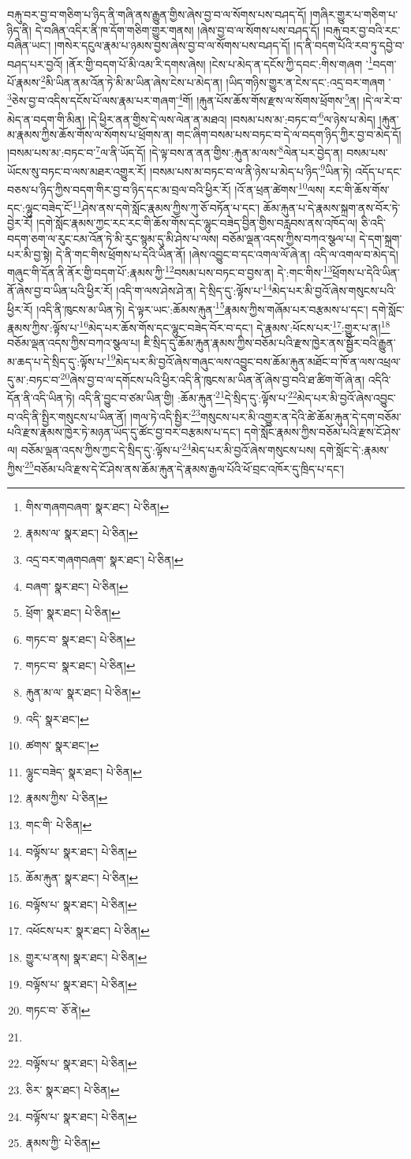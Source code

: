 བརྐུ་བར་བྱ་བ་གཅིག་པ་ཉིད་ནི་གཞི་ནས་རྒྱུན་གྱིས་ཞེས་བྱ་བ་ལ་སོགས་པས་བཤད་དོ། །གཞིར་གྱུར་པ་གཅིག་པ་ཉིད་ནི། དེ་བཞིན་འདིར་ནི་ཁ་དོག་གཅིག་གྱུར་གནས། །ཞེས་བྱ་བ་ལ་སོགས་པས་བཤད་དོ། །བརྐུ་བར་བྱ་བའི་རང་བཞིན་ཡང་། །གསེར་དངུལ་རྣམ་པ་ཉམས་བྱས་ཞེས་བྱ་བ་ལ་སོགས་པས་བཤད་དོ། །ད་ནི་བདག་པོའི་རབ་ཏུ་དབྱེ་བ་བཤད་པར་བྱའོ། །ནོར་གྱི་བདག་པོ་མི་འམ་རི་དགས་ཞེས། །ངེས་པ་མེད་ན་དངོས་ཀྱི་དབང་:གིས་གཞག ་\footnote{གིས་གཞགབཞག་  སྣར་ཐང་།  པེ་ཅིན། }བདག་པོ་རྣམས་\footnote{རྣམས་ལ་  སྣར་ཐང་།  པེ་ཅིན། }མི་ཡིན་ནམ་འོན་ཏེ་མི་མ་ཡིན་ཞེས་ངེས་པ་མེད་ན། །ཡིད་གཉིས་གྱུར་ན་ངེས་དང་:འདྲ་བར་གཞག ་\footnote{འདྲ་བར་གཞགབཞག་  སྣར་ཐང་།  པེ་ཅིན། }ཅེས་བྱ་བ་འདིས་དངོས་པོ་ལས་རྣམ་པར་གཞག་\footnote{བཞག་  སྣར་ཐང་།  པེ་ཅིན། }གོ། །རྐུན་པོས་ཆོས་གོས་རྫས་ལ་སོགས་ཕྲོགས་\footnote{ཕྲོག་  སྣར་ཐང་།  པེ་ཅིན། }ན། །དེ་ལ་རེ་བ་མེད་ན་བདག་གི་མིན། །དེ་ཕྱིར་ནན་གྱིས་དེ་ལས་ལེན་ན་མཐའ། །བསམ་པས་མ་:བཏང་བ་\footnote{གཏང་བ་  སྣར་ཐང་།  པེ་ཅིན། }ལ་ཉེས་པ་མེད། །རྐུན་མ་རྣམས་ཀྱིས་ཆོས་གོས་ལ་སོགས་པ་ཕྲོགས་ན། གང་ཞིག་བསམ་པས་བཏང་བ་དེ་ལ་བདག་ཉིད་ཀྱིར་བྱ་བ་མེད་དོ། །བསམ་པས་མ་:བཏང་བ་\footnote{གཏང་བ་  སྣར་ཐང་།  པེ་ཅིན། }ལ་ནི་ཡོད་དོ། །དེ་ལྟ་བས་ན་ནན་གྱིས་:རྐུན་མ་ལས་\footnote{རྐུན་མ་ལ་  སྣར་ཐང་།  པེ་ཅིན། }ལེན་པར་བྱེད་ན། བསམ་པས་ཡོངས་སུ་བཏང་བ་ལས་མཐར་འགྱུར་རོ། །བསམ་པས་མ་བཏང་བ་ལ་ནི་ཉེས་པ་མེད་པ་ཉིད་\footnote{འདི་  སྣར་ཐང་། }ཡིན་ཏེ། འདོད་པ་དང་བཅས་པ་ཉིད་ཀྱིས་བདག་གིར་བྱ་བ་ཉིད་དང་མ་བྲལ་བའི་ཕྱིར་རོ། །འོ་ན་ཕྲན་ཚེགས་\footnote{ཚགས་  སྣར་ཐང་། }ལས། རང་གི་ཆོས་གོས་དང་:ལྷུང་བཟེད་ངོ་\footnote{ལྷུང་བཟེད་  སྣར་ཐང་།  པེ་ཅིན། }ཤེས་ནས་དགེ་སློང་རྣམས་ཀྱིས་ཀུ་ཅོ་བཏོན་པ་དང་། ཆོམ་རྐུན་པ་དེ་རྣམས་སྐྲག་ནས་བོར་ཏེ་བྱེར་རོ། །དགེ་སློང་རྣམས་ཀྱང་རང་རང་གི་ཆོས་གོས་དང་ལྷུང་བཟེད་བྱིན་གྱིས་བརླབས་ནས་འཁོད་ལ། ཅི་འདི་བདག་ཅག་ལ་རུང་ངམ་འོན་ཏེ་མི་རུང་སྙམ་དུ་མི་ཤེས་པ་ལས། བཅོམ་ལྡན་འདས་ཀྱིས་བཀའ་སྩལ་པ། དེ་དག་སྐྲག་པར་མི་བྱ་སྟེ། དེ་ནི་གང་གིས་ཕྲོགས་པ་དེའི་ཡིན་ནོ། །ཞེས་འབྱུང་བ་དང་འགལ་ལོ་ཞེ་ན། འདི་ལ་འགལ་བ་མེད་དེ། གཞུང་གི་དོན་ནི་ནོར་གྱི་བདག་པོ་:རྣམས་ཀྱི་\footnote{རྣམས་ཀྱིས་  པེ་ཅིན། }བསམ་པས་བཏང་བ་བྱས་ན། དེ་:གང་གིས་\footnote{གང་གི་  པེ་ཅིན། }ཕྲོགས་པ་དེའི་ཡིན་ནོ་ཞེས་བྱ་བ་ཡིན་པའི་ཕྱིར་རོ། །འདི་ག་ལས་ཤེས་ཤེ་ན། དེ་སྲིད་དུ་:ལྟོས་པ་\footnote{བལྟོས་པ་  སྣར་ཐང་།  པེ་ཅིན། }མེད་པར་མི་བྱའོ་ཞེས་གསུངས་པའི་ཕྱིར་རོ། །འདི་ནི་ཁུངས་མ་ཡིན་ཏེ། དེ་ལྟར་ཡང་:ཆོམས་རྐུན་\footnote{ཆོམ་རྐུན་  སྣར་ཐང་།  པེ་ཅིན། }རྣམས་ཀྱིས་གཞོམ་པར་བརྩམས་པ་དང་། དགེ་སློང་རྣམས་ཀྱིས་:ལྟོས་པ་\footnote{བལྟོས་པ་  སྣར་ཐང་།  པེ་ཅིན། }མེད་པར་ཆོས་གོས་དང་ལྷུང་བཟེད་བོར་བ་དང་། དེ་རྣམས་:ཕོངས་པར་\footnote{འཕོངས་པར་  སྣར་ཐང་།  པེ་ཅིན། }:གྱུར་པ་ན།\footnote{གྱུར་པ་ནས།  སྣར་ཐང་།  པེ་ཅིན། } བཅོམ་ལྡན་འདས་ཀྱིས་བཀའ་སྩལ་པ། ཇི་སྲིད་དུ་ཆོམ་རྐུན་རྣམས་ཀྱིས་བཅོམ་པའི་རྫས་ཁྱེར་ནས་སྦྱོར་བའི་རྒྱུན་མ་ཆད་པ་དེ་སྲིད་དུ་:ལྟོས་པ་\footnote{བལྟོས་པ་  སྣར་ཐང་།  པེ་ཅིན། }མེད་པར་མི་བྱའོ་ཞེས་གཞུང་ལས་འབྱུང་བས་ཆོམ་རྐུན་མཐོང་བ་ཁོ་ན་ལས་འཕྲལ་དུ་མ་:བཏང་བ་\footnote{གཏང་བ་  ཅོ་ནེ། }ཞེས་བྱ་བ་ལ་དགོངས་པའི་ཕྱིར་འདི་ནི་ཁུངས་མ་ཡིན་ནོ་ཞེས་བྱ་བའི་ཐ་ཚིག་གོ་ཞེ་ན། འདིའི་དོན་ནི་འདི་ཡིན་ཏེ། འདི་ནི་བྱུང་བ་ཙམ་ཡིན་གྱི། :ཆོམ་རྐུན་\footnote{}དེ་སྲིད་དུ་:ལྟོས་པ་\footnote{བལྟོས་པ་  སྣར་ཐང་།  པེ་ཅིན། }མེད་པར་མི་བྱའོ་ཞེས་འབྱུང་བ་འདི་ནི་སྤྱིར་གསུངས་པ་ཡིན་ནོ། །གལ་ཏེ་འདི་སྤྱིར་\footnote{ཅིར་  སྣར་ཐང་།  པེ་ཅིན། }གསུངས་པར་མི་འགྱུར་ན་དེའི་ཚེ་ཆོམ་རྐུན་དེ་དག་བཅོམ་པའི་རྫས་རྣམས་ཁྱེར་ཏེ་མཉན་ཡོད་དུ་ཚོང་བྱ་བར་བརྩམས་པ་དང་། དགེ་སློང་རྣམས་ཀྱིས་བཅོམ་པའི་རྫས་ངོ་ཤེས་ལ། བཅོམ་ལྡན་འདས་ཀྱིས་ཀྱང་དེ་སྲིད་དུ་:ལྟོས་པ་\footnote{བལྟོས་པ་  སྣར་ཐང་།  པེ་ཅིན། }མེད་པར་མི་བྱའོ་ཞེས་གསུངས་པས། དགེ་སློང་དེ་:རྣམས་ཀྱིས་\footnote{རྣམས་ཀྱི་  པེ་ཅིན། }བཅོམ་པའི་རྫས་དེ་ངོ་ཤེས་ནས་ཆོམ་རྐུན་དེ་རྣམས་རྒྱལ་པོའི་ཕོ་བྲང་འཁོར་དུ་ཁྲིད་པ་དང་། 